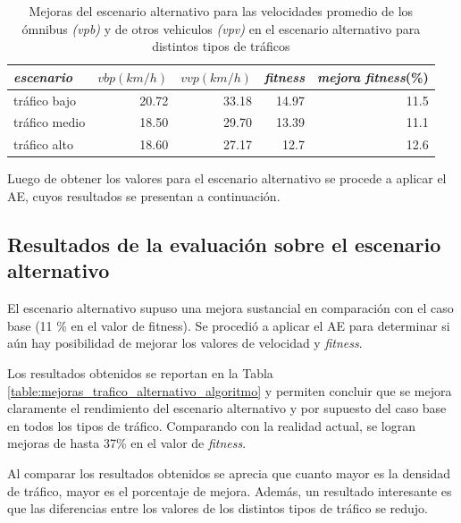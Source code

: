 \begin{table}[H]
	\renewcommand{\arraystretch}{1}
	\renewcommand{\tabcolsep}{12pt}	
	\caption[Mejoras del escenario alternativo.]{Mejoras del escenario alternativo  para las velocidades promedio de los ómnibus \textit{(vpb)} y de otros vehiculos \textit{(vpv)} en el escenario alternativo para distintos tipos de tráficos }
	\label{table:mejoras_trafico_alternativo}
	\centering
	\begin{tabular}{lrrrr }
		\toprule
		\textit{escenario}&
		$vbp(km/h)$& 
		$vvp(km/h)$ & 
		\textit{fitness} &
		\textit{mejora } \newline \textit{fitness}(\%)
		\\ 
		\midrule
		tráfico bajo & 20.72  & 33.18 & 14.97 & 11.5\\
		tráfico medio & 18.50  & 29.70& 13.39 & 11.1 \\
		tráfico alto  & 18.60  & 27.17& 12.7 & 12.6\\		
		\bottomrule
	\end{tabular}
\end{table}


Luego de obtener los valores para el escenario alternativo se procede a aplicar el AE, cuyos resultados se presentan a continuación.


\subsection{Resultados de la evaluación sobre el escenario alternativo}

El escenario alternativo supuso una mejora sustancial en comparación con el caso base (11 \% en el valor de fitness). Se procedió a aplicar el AE para determinar si aún hay posibilidad de mejorar los valores de velocidad y \emph{fitness}.


Los resultados obtenidos se reportan en la Tabla \ref{table:mejoras_trafico_alternativo_algoritmo} y permiten concluir que se mejora claramente el rendimiento del escenario alternativo y por supuesto del caso base en todos los tipos de tráfico. Comparando con la realidad actual, se logran mejoras de hasta 37\% en el valor de \emph{fitness}. 

Al comparar los resultados obtenidos se aprecia que cuanto mayor es la densidad de tráfico, mayor es el porcentaje de mejora. Además, un resultado interesante es que las diferencias entre los valores de los distintos tipos de tráfico se redujo.


